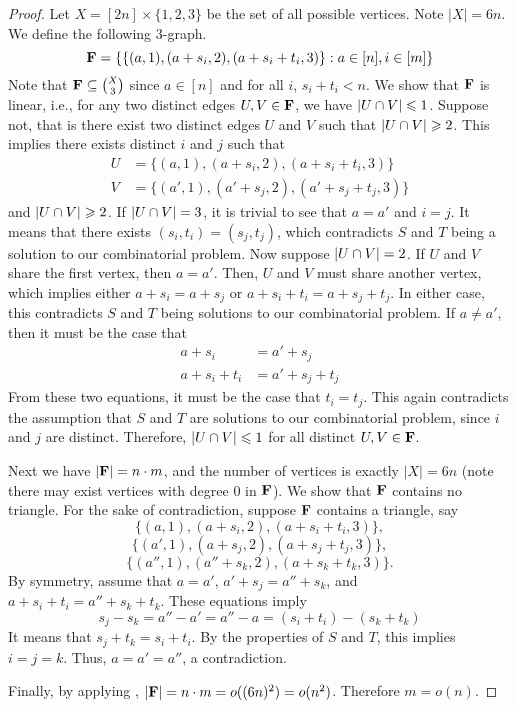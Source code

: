 \begin{proof}
	Let $X = [2n] \times \{1,2,3\}$ be the set of all possible vertices. Note $|X| = 6n$. We define the following 3-graph. 
	$$ {\mathbf F} = \{ \{(a,1), (a+s_i, 2), (a + s_i + t_i,3)\} : a \in [n], i \in [m] \} $$
	Note that ${\mathbf F} \subseteq \binom{X}{3}$ since $a \in [n]$ and for all $i$, $s_i + t_i < n$. We show that $ {\mathbf F} $ is linear, i.e., for any two distinct edges $ U,V \in {\mathbf F}$, we have $ \left\vert{U \cap V}\right\vert \leqslant 1 $. Suppose not, that is there exist two distinct edges $U$ and $V$ such that $\abs{U\intersect V} \geq 2$. This implies there exists distinct $i$ and $j$ such that
	\begin{align*}
		U &= \{ (a,1), (a+s_i,2), (a+s_i + t_i, 3) \}\\
		V &= \{ (a',1), (a'+s_j,2), (a'+s_j+t_j,3) \}
	\end{align*}
	and $\left\vert{U\cap V}\right\vert \geqslant 2$. If $\left\vert{U\cap V}\right\vert = 3$, it is trivial to see that $a=a'$ and $i=j$. It means that there exists $(s_i,t_i) = (s_j,t_j)$, which contradicts $S$ and $T$ being a solution to our combinatorial problem. Now suppose $\left\vert{U\cap V}\right\vert = 2$. If $U$ and $V$ share the first vertex, then $a = a'$. Then, $U$ and $V$ must share another vertex, which implies either $a+s_i = a+s_j$ or $a+s_i+t_i = a+s_j+t_j$. In either case, this contradicts $S$ and $T$ being solutions to our combinatorial problem. If $a\neq a'$, then it must be the case that
	\begin{align*}
		a+s_i &= a'+s_j\\
		a+s_i+t_i &= a'+s_j+t_j
	\end{align*}
	From these two equations, it must be the case that $t_i = t_j$. This again contradicts the assumption that $S$ and $T$ are solutions to our combinatorial problem, since $i$ and $j$ are distinct. Therefore, $\left\vert{U\cap V}\right\vert \leqslant 1$ for all distinct $U, V \in {\mathbf F}$.
	
	Next we have $ \left\vert{\ensuremath{{\mathbf F}}}\right\vert = n \cdot m$, and the number of vertices is exactly $|X| = 6n$ (note there may exist vertices with degree 0 in ${\mathbf F}$). We show that $ {\mathbf F} $ contains no triangle. For the sake of contradiction, suppose $ {\mathbf F} $ contains a triangle, say
	$$  \{ (a, 1), (a+s_i, 2), (a+ s_i + t_i, 3)\}, $$
	$$ \{ (a', 1), (a+s_j, 2), (a+ s_j + t_j, 3)\}, $$
	$$ \{ (a'', 1), (a''+s_k, 2), (a+ s_k + t_k, 3)\}. $$
	By symmetry, assume that $ a = a'$, $a' + s_j = a'' + s_k$, and $a + s_i+ t_i = a'' + s_k + t_k $.
	These equations imply
	$$ s_j - s_k = a'' - a' = a'' - a = (s_i + t_i) - (s_k + t_k)$$
	It means that $ s_j + t_k = s_i + t_i $. By the properties of $ S $ and $ T $, this implies $  i = j = k $. Thus, $ a = a' = a'' $, a contradiction.
	
	Finally, by applying , $ \left\vert{\ensuremath{{\mathbf F}}}\right\vert = n \cdot m = o((6n)^2) = o(n^2) $. Therefore $ m = o(n) $. 
\end{proof}



